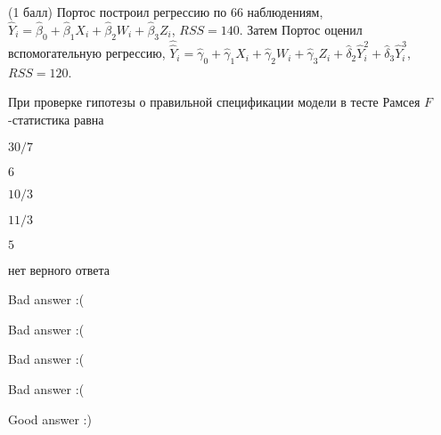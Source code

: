 
\begin{question}
(1 балл) Портос построил регрессию по 66 наблюдениям,
\(\hat Y_i = \hat\beta_0 + \hat\beta_1 X_i + \hat\beta_2 W_i + \hat\beta_3 Z_i\),
\(RSS=140\). Затем Портос оценил вспомогательную регрессию,
\(\hat{\hat {Y}}_i = \hat\gamma_0 + \hat\gamma_1 X_i + \hat\gamma_2 W_i + \hat\gamma_3 Z_i + \hat\delta_2 \hat Y_i^2 + \hat\delta_3 \hat Y_i^3\),
\(RSS=120\).

При проверке гипотезы о правильной спецификации модели в тесте Рамсея
\(F\)-статистика равна
\begin{answerlist}
  \item \(30/7\)
  \item \(6\)
  \item \(10/3\)
  \item \(11/3\)
  \item \(5\)
  \item нет верного ответа
\end{answerlist}
\end{question}

\begin{solution}
\begin{answerlist}
  \item Bad answer :(
  \item Bad answer :(
  \item Bad answer :(
  \item Bad answer :(
  \item Good answer :)
\end{answerlist}
\end{solution}
